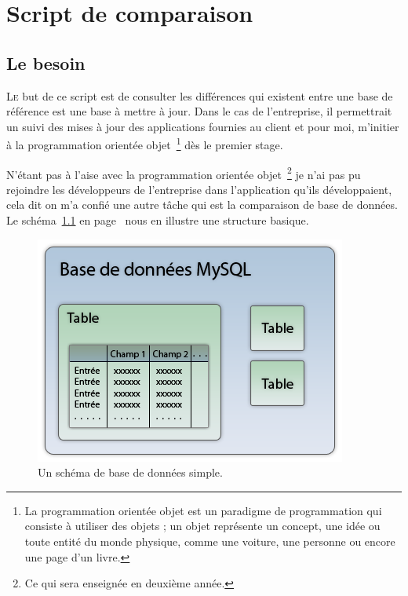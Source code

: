 \chapter{Script de comparaison} %
\label{cha:Script de comparaison}

\section{Le besoin} %
\label{sec:Le besoin}

\lettrine{L}{e} but de ce script est de consulter les différences qui existent
entre une base de référence est une base à mettre à jour. Dans le cas de
l'entreprise, il permettrait un suivi des mises à jour des applications
fournies au client et pour moi, m'initier à la programmation orientée objet\,
\footnote{La programmation orientée objet est un paradigme de programmation qui
consiste à utiliser des objets ; un objet représente un concept, une idée ou
toute entité du monde physique, comme une voiture, une personne ou encore une
page d'un livre.} dès le premier stage.

N'étant pas à l'aise avec la programmation orientée objet\, \footnote{Ce qui
sera enseignée en deuxième année.} je n'ai pas pu rejoindre les développeurs de
l'entreprise dans l'application qu'ils développaient, cela dit on m'a confié
une autre tâche qui est la comparaison de base de données. Le schéma~\ref{bdd}
en page~\pageref{bdd} nous en illustre une structure basique.

\begin{figure}
\begin{center}
\includegraphics[scale=0.7]{images/bdd.png}
\end{center}
\caption{Un schéma de base de données simple.}
\label{bdd}
\end{figure}

